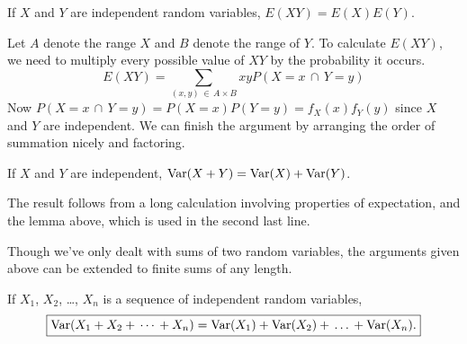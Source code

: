 \begin{lem}\label{ExpectationIndependentProduct} If $X$ and $Y$ are independent random variables, $E(XY) = E(X)E(Y)$.
\end{lem}
\begin{pf} Let $A$ denote the range $X$ and $B$ denote the range of $Y$. To calculate $E(XY)$, we need to multiply every possible value of $XY$ by the probability it occurs.
$$E(XY) = \sum_{(x, y) \,\in\, A \times B} xy P(X = x \,\cap\, Y= y)$$
\noindent Now $P(X = x \,\cap\, Y= y) = P(X = x)P(Y=y) = f_X(x)f_Y(y)$ since $X$ and $Y$ are independent. We can finish the argument by arranging the order of summation nicely and factoring. 
\end{pf}

\begin{thm}\label{VarianceIndependentSum} If $X$ and $Y$ are independent, $\operatorname{Var}(X+Y) = \operatorname{Var}(X) + \operatorname{Var}(Y)$.
\end{thm}
\begin{pf} The result follows from a long calculation involving properties of expectation, and the lemma above, which is used in the second last line.
\end{pf}

Though we've only dealt with sums of two random variables, the arguments given above can be extended to finite sums of any length.

\begin{cor}\label{expectationandvarianceofindependentsum}If $X_1$, $X_2$, \dots , $X_n$ is a sequence of independent random variables,
$$\boxed{\operatorname{Var}(X_1 + X_2 + \, \cdots \, + X_n) = \operatorname{Var}(X_1) + \operatorname{Var}(X_2) + \, \dots \, + \operatorname{Var}(X_n).}$$
\end{cor}

